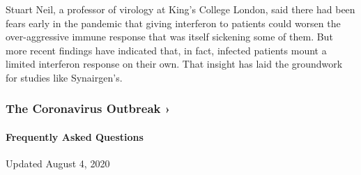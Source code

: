 Stuart Neil, a professor of virology at King's College London, said
there had been fears early in the pandemic that giving interferon to
patients could worsen the over-aggressive immune response that was
itself sickening some of them. But more recent findings have indicated
that, in fact, infected patients mount a limited interferon response on
their own. That insight has laid the groundwork for studies like
Synairgen's.

\href{https://www.nytimes.com/news-event/coronavirus?action=click\&pgtype=Article\&state=default\&region=MAIN_CONTENT_3\&context=storylines_faq}{}

\hypertarget{the-coronavirus-outbreak-}{%
\subsubsection{The Coronavirus Outbreak
›}\label{the-coronavirus-outbreak-}}

\hypertarget{frequently-asked-questions}{%
\paragraph{Frequently Asked
Questions}\label{frequently-asked-questions}}

Updated August 4, 2020

